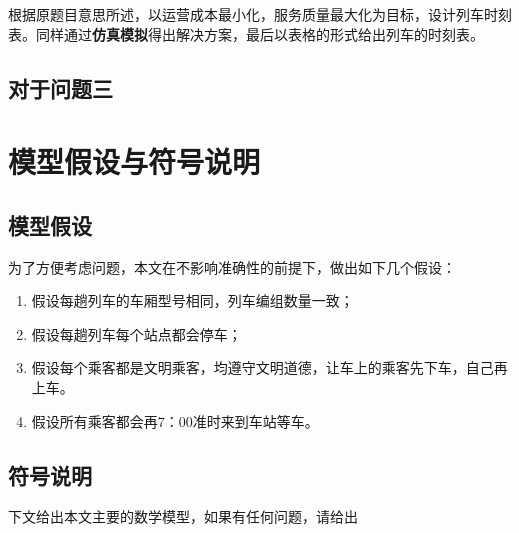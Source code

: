 根据原题目意思所述，以运营成本最小化，服务质量最大化为目标，设计列车时刻表。同样通过\textbf{仿真模拟}得出解决方案，最后以表格的形式给出列车的时刻表。

\subsection{对于问题三}



%
%

\section{模型假设与符号说明}

\subsection{模型假设}

为了方便考虑问题，本文在不影响准确性的前提下，做出如下几个假设：

\begin{enumerate}
    \item 假设每趟列车的车厢型号相同，列车编组数量一致；
    \item 假设每趟列车每个站点都会停车；
    \item 假设每个乘客都是文明乘客，均遵守文明道德，让车上的乘客先下车，自己再上车。
    \item 假设所有乘客都会再7：00准时来到车站等车。
\end{enumerate}

\subsection{符号说明}

下文给出本文主要的数学模型，如果有任何问题，请给出


